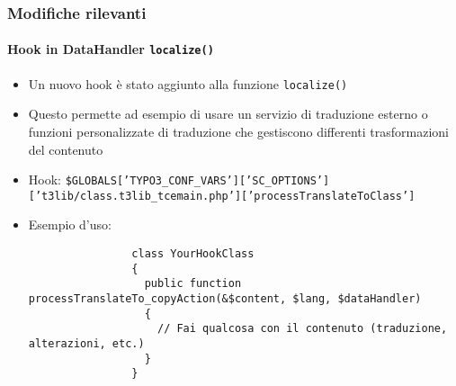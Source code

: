 \begin{frame}[fragile]
	\frametitle{Modifiche rilevanti}
	\framesubtitle{Hook in DataHandler \texttt{localize()}}

	\lstset{basicstyle=\tiny\ttfamily}

	\begin{itemize}
		\item Un nuovo hook è stato aggiunto alla funzione \texttt{localize()}
		\item Questo permette ad esempio di usare un servizio di traduzione esterno o funzioni personalizzate
			di traduzione che gestiscono differenti trasformazioni del contenuto
	\end{itemize}

	\begin{itemize}
		\item Hook:\newline
			\smaller
				\texttt{\$GLOBALS['TYPO3\_CONF\_VARS']['SC\_OPTIONS']\newline
				\tabto{0.4cm}['t3lib/class.t3lib\_tcemain.php']['processTranslateToClass']}
			\normalsize

		\item Esempio d'uso:

			\begin{lstlisting}
				class YourHookClass
				{
				  public function processTranslateTo_copyAction(&$content, $lang, $dataHandler)
				  {
				    // Fai qualcosa con il contenuto (traduzione, alterazioni, etc.)
				  }
				}
			\end{lstlisting}
	\end{itemize}

\end{frame}









